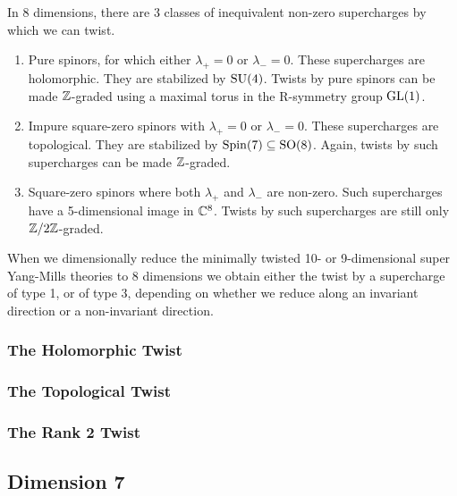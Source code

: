 \documentclass[10pt, oneside]{article}
\begin{document}
In 8 dimensions, there are 3 classes of inequivalent non-zero supercharges by which we can twist.
\begin{enumerate}
 \item Pure spinors, for which either $\lambda_+ = 0$ or $\lambda_- = 0$.  These supercharges are holomorphic.  They are stabilized by $\mathrm{SU}(4)$.  Twists by pure spinors can be made $\mathbb Z$-graded using a maximal torus in the R-symmetry group $\mathrm{GL}(1)$.
 \item Impure square-zero spinors with $\lambda_+ = 0$ or $\lambda_- = 0$.  These supercharges are topological.  They are stabilized by $\mathrm{Spin}(7) \subseteq \mathrm{SO}(8)$.  Again, twists by such supercharges can be made $\mathbb Z$-graded.
 \item Square-zero spinors where both $\lambda_+$ and $\lambda_-$ are non-zero.  Such supercharges have a 5-dimensional image in $\mathbb C^8$.  Twists by such supercharges are still only $\mathbb Z/2\mathbb Z$-graded.
\end{enumerate}

When we dimensionally reduce the minimally twisted 10- or 9-dimensional super Yang-Mills theories to 8 dimensions we obtain either the twist by a supercharge of type 1, or of type 3, depending on whether we reduce along an invariant direction or a non-invariant direction. 

\subsubsection{The Holomorphic Twist}

\subsubsection{The Topological Twist}

\subsubsection{The Rank 2 Twist}



\subsection{Dimension 7}

\end{document}
